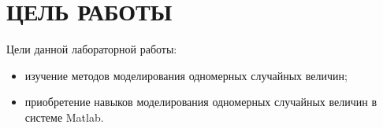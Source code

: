 \section{ЦЕЛЬ РАБОТЫ}

Цели данной лабораторной работы:

\begin{itemize}

\item
  изучение методов моделирования одномерных случайных величин;
\item
  приобретение навыков моделирования одномерных случайных величин в системе Matlab.

\end{itemize}
